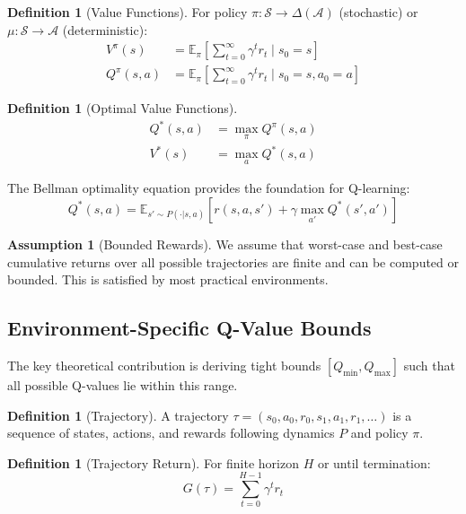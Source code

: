 \documentclass[11pt]{article}
\theoremstyle{definition}
\newtheorem{definition}[theorem]{Definition}
\newtheorem{assumption}[theorem]{Assumption}
\theoremstyle{remark}
\newcommand{\E}{\mathbb{E}}
\begin{document}
\begin{definition}[Value Functions]
For policy $\pi: \mathcal{S} \to \Delta(\mathcal{A})$ (stochastic) or $\mu: \mathcal{S} \to \mathcal{A}$ (deterministic):
\begin{align}
V^\pi(s) &= \E_\pi\left[\sum_{t=0}^\infty \gamma^t r_t \mid s_0 = s\right] \\
Q^\pi(s,a) &= \E_\pi\left[\sum_{t=0}^\infty \gamma^t r_t \mid s_0 = s, a_0 = a\right]
\end{align}
\end{definition}

\begin{definition}[Optimal Value Functions]
\begin{align}
Q^*(s,a) &= \max_\pi Q^\pi(s,a) \\
V^*(s) &= \max_a Q^*(s,a)
\end{align}
\end{definition}

The Bellman optimality equation \citep{bellman1957markovian, sutton2018reinforcement} provides the foundation for Q-learning:
$$Q^*(s,a) = \E_{s' \sim P(\cdot|s,a)}\left[r(s,a,s') + \gamma \max_{a'} Q^*(s',a')\right]$$

\begin{assumption}[Bounded Rewards]
We assume that worst-case and best-case cumulative returns over all possible trajectories are finite and can be computed or bounded. This is satisfied by most practical environments.
\end{assumption}

\subsection{Environment-Specific Q-Value Bounds}

The key theoretical contribution is deriving tight bounds $[Q_{\min}, Q_{\max}]$ such that all possible Q-values lie within this range.

\begin{definition}[Trajectory]
A trajectory $\tau = (s_0, a_0, r_0, s_1, a_1, r_1, \ldots)$ is a sequence of states, actions, and rewards following dynamics $P$ and policy $\pi$.
\end{definition}

\begin{definition}[Trajectory Return]
For finite horizon $H$ or until termination:
$$G(\tau) = \sum_{t=0}^{H-1} \gamma^t r_t$$
\end{definition}
\end{document}
